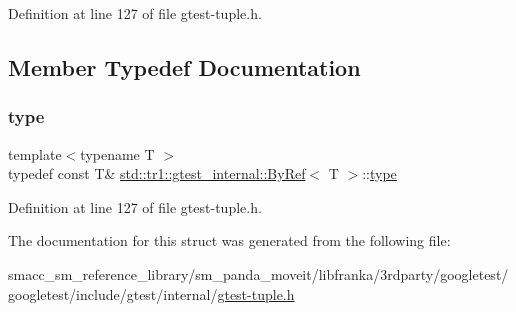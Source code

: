 Definition at line 127 of file gtest-\/tuple.\+h.



\subsection{Member Typedef Documentation}
\mbox{\label{structstd_1_1tr1_1_1gtest__internal_1_1ByRef_ac42ad942ee1cfa86b2abcce9b88ac10e}} 
\subsubsection{\texorpdfstring{type}{type}}
{\footnotesize\ttfamily template$<$typename T $>$ \\
typedef const T\& \hyperlink{structstd_1_1tr1_1_1gtest__internal_1_1ByRef}{std\+::tr1\+::gtest\+\_\+internal\+::\+By\+Ref}$<$ T $>$\+::\hyperlink{structstd_1_1tr1_1_1gtest__internal_1_1ByRef_ac42ad942ee1cfa86b2abcce9b88ac10e}{type}}



Definition at line 127 of file gtest-\/tuple.\+h.



The documentation for this struct was generated from the following file\+:\begin{DoxyCompactItemize}
\item 
smacc\+\_\+sm\+\_\+reference\+\_\+library/sm\+\_\+panda\+\_\+moveit/libfranka/3rdparty/googletest/googletest/include/gtest/internal/\hyperlink{gtest-tuple_8h}{gtest-\/tuple.\+h}\end{DoxyCompactItemize}
